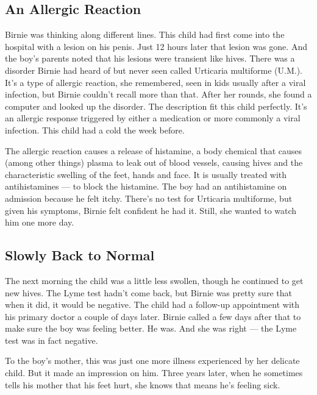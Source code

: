 \hypertarget{an-allergic-reaction}{%
\subsection{\texorpdfstring{\textbf{An Allergic
Reaction}}{An Allergic Reaction}}\label{an-allergic-reaction}}

Birnie was thinking along different lines. This child had first come
into the hospital with a lesion on his penis. Just 12 hours later that
lesion was gone. And the boy's parents noted that his lesions were
transient like hives. There was a disorder Birnie had heard of but never
seen called Urticaria multiforme (U.M.). It's a type of allergic
reaction, she remembered, seen in kids usually after a viral infection,
but Birnie couldn't recall more than that. After her rounds, she found a
computer and looked up the disorder. The description fit this child
perfectly. It's an allergic response triggered by either a medication or
more commonly a viral infection. This child had a cold the week before.

The allergic reaction causes a release of histamine, a body chemical
that causes (among other things) plasma to leak out of blood vessels,
causing hives and the characteristic swelling of the feet, hands and
face. It is usually treated with antihistamines --- to block the
histamine. The boy had an antihistamine on admission because he felt
itchy. There's no test for Urticaria multiforme, but given his symptoms,
Birnie felt confident he had it. Still, she wanted to watch him one more
day.

\hypertarget{slowly-back-to-normal}{%
\subsection{\texorpdfstring{\textbf{Slowly Back to
Normal}}{Slowly Back to Normal}}\label{slowly-back-to-normal}}

The next morning the child was a little less swollen, though he
continued to get new hives. The Lyme test hadn't come back, but Birnie
was pretty sure that when it did, it would be negative. The child had a
follow-up appointment with his primary doctor a couple of days later.
Birnie called a few days after that to make sure the boy was feeling
better. He was. And she was right --- the Lyme test was in fact
negative.

To the boy's mother, this was just one more illness experienced by her
delicate child. But it made an impression on him. Three years later,
when he sometimes tells his mother that his feet hurt, she knows that
means he's feeling sick.

